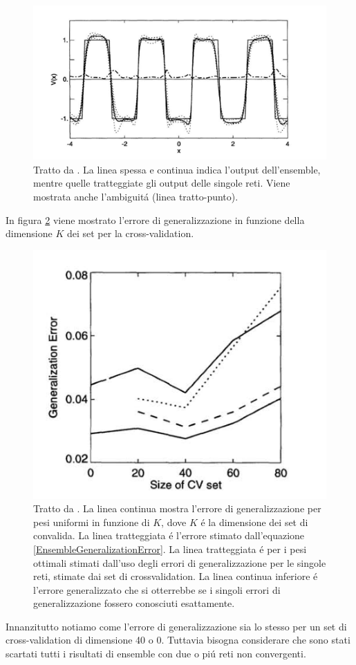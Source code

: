 \documentclass[a4paper,12pt]{report}
\begin{document}
  \begin{figure}[h!]
   \centering
   \includegraphics[scale=0.4]{SqWave.png}
   \caption{Tratto da \cite{krogh1995neural}. La linea spessa e continua indica l'output dell'ensemble, mentre quelle tratteggiate gli output delle singole reti. Viene mostrata anche l'ambiguit\'a (linea tratto-punto).}
   \label{SqWavepng}
  \end{figure}
  In figura \ref{GenErrorpng} viene mostrato l'errore di generalizzazione in funzione della dimensione $K$ dei set per la cross-validation.
  \begin{figure}[h!]
   \centering
   \includegraphics[scale=0.4]{GenError.png} 
   \caption{Tratto da \cite{krogh1995neural}. La linea continua mostra l'errore di generalizzazione per pesi uniformi in funzione di $K$, dove $K$ \'e la dimensione dei set di convalida. La linea tratteggiata \'e l'errore stimato dall'equazione \ref{EnsembleGeneralizationError}. La linea tratteggiata \'e per i pesi ottimali stimati dall'uso degli errori di generalizzazione per le singole reti, stimate dai set di crossvalidation. La linea continua inferiore \'e l'errore generalizzato che si otterrebbe se i singoli errori di generalizzazione fossero conosciuti esattamente.}
   \label{GenErrorpng}
  \end{figure}
  Innanzitutto notiamo come l'errore di generalizzazione sia lo stesso per un set di cross-validation di dimensione 40 o 0. 
  Tuttavia bisogna considerare che sono stati scartati tutti i risultati di ensemble con due o pi\'u reti non convergenti.
\end{document}
